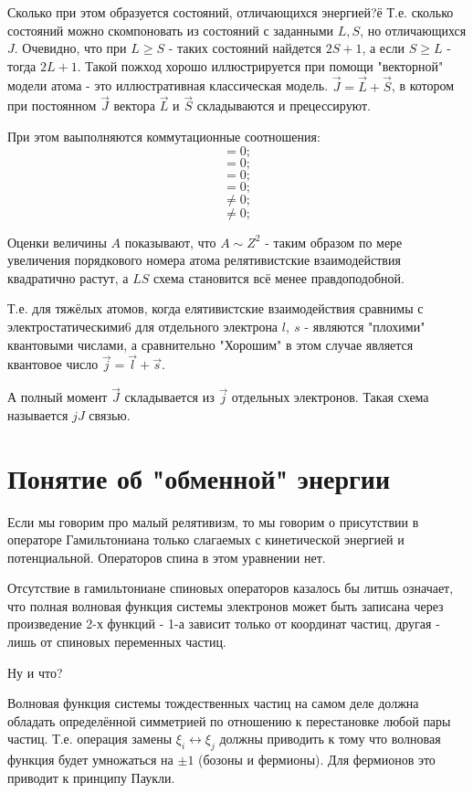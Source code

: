 \documentclass[a4paper, 14pt, russian]{article}
\newcommand{\be}{\begin{equation}}
\newcommand{\ee}{\end{equation}}
\begin{document}
	Сколько при этом образуется состояний, отличающихся энергией?ё
	Т.е. сколько состояний можно скомпоновать  из состояний с заданными $L,S$,
	но отличающихся $J$. Очевидно, что при $L \ge S$ - таких состояний найдется
	$2S + 1$, а если $S \ge L$ - тогда $2L + 1$. Такой пожход хорошо
	иллюстрируется при помощи "векторной" модели атома - это иллюстративная
	классическая модель. $\vec J = \vec L + \vec S$, в котором при постоянном 
	$\vec J$ вектора $\vec L$ и $\vec S$ складываются и прецессируют.

	При этом ваыполняются коммутационные соотношения:
	\be
		[\hat{V}_{LS}; \vec{J}^2] = 0;
	\ee
	\be
		[\hat{V}_{LS}; J_i] = 0;
	\ee
	\be
		[\hat{V}_{LS}; \vec{S}^2] = 0;
	\ee
	\be
		[\hat{V}_{LS}; \vec{L}^2] = 0;
	\ee
	\be
		[\hat{V}_{LS}; S_i] \neq 0;
	\ee
	\be
		[\hat{V}_{LS}; L_i] \neq 0;
	\ee

	Оценки величины $A$ показывают, что $A \sim Z^2$ -
	таким образом по мере увеличения порядкового номера 
	атома релятивистские взаимодействия квадратично растут,
	а $LS$ схема становится всё менее правдоподобной.

	Т.е. для тяжёлых атомов, когда елятивистские взаимодействия
	сравнимы с электростатическими6 для отдельного электрона
	$l,~s$ - являются "плохими" квантовыми числами, а сравнительно 
	"Хорошим" в этом случае является квантовое число  
	$\vec j = \vec l + \vec s$.

	А полный момент $\vec J$ складывается из $\vec j$ 
	отдельных электронов. Такая схема называется $jJ$ связью.

	\section{Понятие об "обменной" энергии}

	Если мы говорим про малый релятивизм, то мы говорим о присутствии
	в операторе Гамильтониана только слагаемых с кинетической энергией
	и потенциальной. Операторов спина в этом уравнении нет.

	Отсутствие в гамильтониане спиновых операторов казалось бы
	литшь означает, что полная волновая функция системы электронов 
	может быть записана через произведение 2-х функций - 1-а зависит только
	от координат частиц, другая - лишь от спиновых переменных частиц.
	
	Ну и что?

	Волновая функция системы тождественных частиц на самом деле должна обладать
	определённой симметрией по отношению к перестановке 
	любой пары частиц. Т.е. операция  замены $\xi_i \leftrightarrow \xi_j$
	должны приводить к тому что волновая функция будет умножаться на $\pm 1$ 
	(бозоны и фермионы). Для фермионов это приводит к принципу Паукли.
\end{document}
